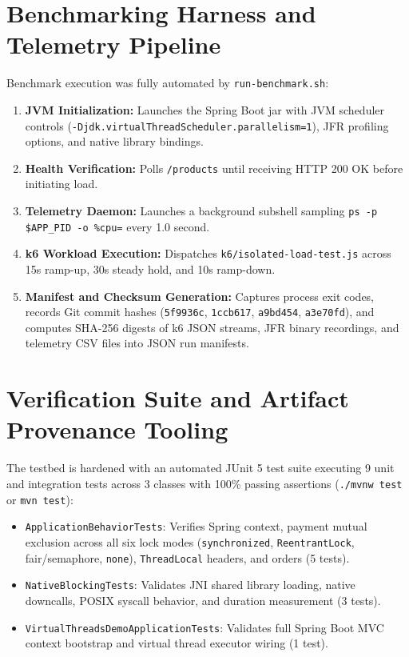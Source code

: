 \section{Benchmarking Harness and Telemetry Pipeline}
\label{sec:benchmarking-harness}

Benchmark execution was fully automated by \texttt{run-benchmark.sh}:
\begin{enumerate}
  \item \textbf{JVM Initialization:} Launches the Spring Boot jar with JVM scheduler controls (\texttt{-Djdk.virtualThreadScheduler.parallelism=1}), JFR profiling options, and native library bindings.
  \item \textbf{Health Verification:} Polls \texttt{/products} until receiving HTTP 200 OK before initiating load.
  \item \textbf{Telemetry Daemon:} Launches a background subshell sampling \texttt{ps -p \$APP\_PID -o \%cpu=} every 1.0 second.
  \item \textbf{k6 Workload Execution:} Dispatches \texttt{k6/isolated-load-test.js} across 15s ramp-up, 30s steady hold, and 10s ramp-down.
  \item \textbf{Manifest and Checksum Generation:} Captures process exit codes, records Git commit hashes (\texttt{5f9936c}, \texttt{1ccb617}, \texttt{a9bd454}, \texttt{a3e70fd}), and computes SHA-256 digests of k6 JSON streams, JFR binary recordings, and telemetry CSV files into JSON run manifests.
\end{enumerate}

\section{Verification Suite and Artifact Provenance Tooling}
\label{sec:verification-tooling}

The testbed is hardened with an automated JUnit 5 test suite executing 9 unit and integration tests across 3 classes with 100\% passing assertions (\texttt{./mvnw test} or \texttt{mvn test}):
\begin{itemize}
  \item \texttt{ApplicationBehaviorTests}: Verifies Spring context, payment mutual exclusion across all six lock modes (\texttt{synchronized}, \texttt{ReentrantLock}, fair/semaphore, \texttt{none}), \texttt{ThreadLocal} headers, and orders (5 tests).
  \item \texttt{NativeBlockingTests}: Validates JNI shared library loading, native downcalls, POSIX syscall behavior, and duration measurement (3 tests).
  \item \texttt{VirtualThreadsDemoApplicationTests}: Validates full Spring Boot MVC context bootstrap and virtual thread executor wiring (1 test).
\end{itemize}

